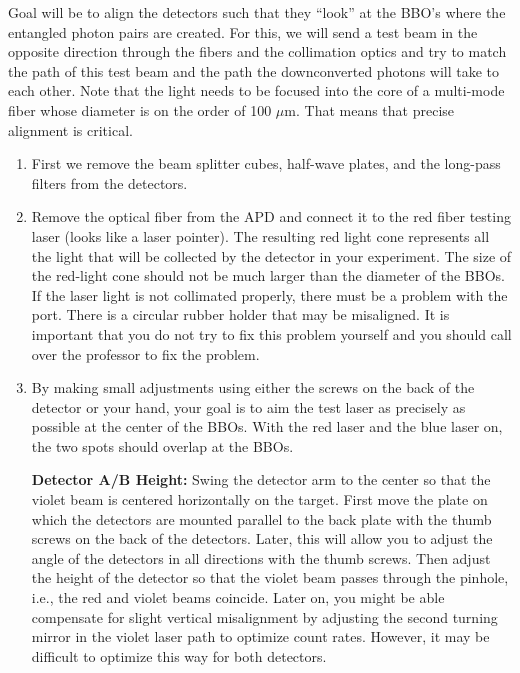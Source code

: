 \documentclass{../lab}
\begin{document}
Goal will be to align the detectors such that they ``look'' at the BBO's where the entangled photon pairs are created. For this, we will send a test beam in the opposite direction through the fibers and the collimation optics and try to match the path of this test beam and the path the downconverted photons will take to each other. Note that the light needs to be focused into the core of a multi-mode fiber whose diameter is on the order of 100 $\mu$m. That means that precise alignment is critical.

\begin{enumerate}
    \item First we remove the beam splitter cubes, half-wave plates, and the long-pass filters from the detectors.

    \item Remove the optical fiber from the APD and connect it to the red fiber testing laser (looks like a laser pointer). The resulting red light cone represents all the light that will be collected by the detector in your experiment. The size of the red-light cone should not be much larger than the diameter of the BBOs. If the laser light is not collimated properly, there must be a problem with the port. There is a circular rubber holder that may be misaligned. It is important that you do not try to fix this problem yourself and you should call over the professor to fix the problem.

    \item By making small adjustments using either the screws on the back of the detector or your hand, your goal is to aim the test laser as precisely  as possible at the center of the BBOs. With the red laser and the blue laser on, the two spots should overlap at the BBOs.
    
    \textbf{Detector A/B Height:} Swing the detector arm to the center so that the violet beam is centered horizontally on the target. First move the plate on which the detectors are mounted parallel to the back plate with the thumb screws on the back of the detectors. Later, this will allow you to adjust the angle of the detectors in all directions with the thumb screws. Then adjust the height of the detector so that the violet beam passes through the pinhole, i.e., the red and violet beams coincide. Later on, you might be able compensate for slight vertical misalignment by adjusting the second turning mirror in the violet laser path to optimize count rates. However, it may be difficult to optimize this way for both detectors.
    

\end{enumerate}
\end{document}

